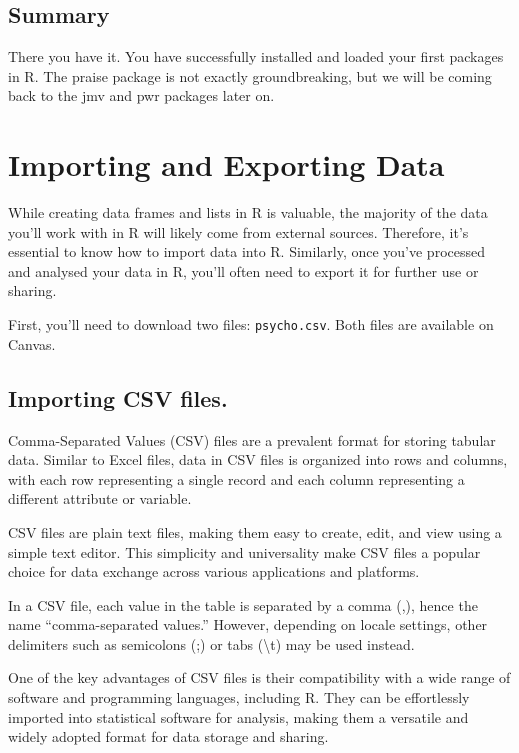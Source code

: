 \documentclass[
]{book}
\begin{document}
\subsection{Summary}\label{summary-2}

There you have it. You have successfully installed and loaded your first packages in R. The praise package is not exactly groundbreaking, but we will be coming back to the jmv and pwr packages later on.

\section{Importing and Exporting Data}\label{importing}

While creating data frames and lists in R is valuable, the majority of the data you'll work with in R will likely come from external sources. Therefore, it's essential to know how to import data into R. Similarly, once you've processed and analysed your data in R, you'll often need to export it for further use or sharing.

First, you'll need to download two files: \texttt{psycho.csv}. Both files are available on Canvas.

\subsection{Importing CSV files.}\label{importing-csv-files.}

Comma-Separated Values (CSV) files are a prevalent format for storing tabular data. Similar to Excel files, data in CSV files is organized into rows and columns, with each row representing a single record and each column representing a different attribute or variable.

CSV files are plain text files, making them easy to create, edit, and view using a simple text editor. This simplicity and universality make CSV files a popular choice for data exchange across various applications and platforms.

In a CSV file, each value in the table is separated by a comma (,), hence the name ``comma-separated values.'' However, depending on locale settings, other delimiters such as semicolons (;) or tabs (\textbackslash t) may be used instead.

One of the key advantages of CSV files is their compatibility with a wide range of software and programming languages, including R. They can be effortlessly imported into statistical software for analysis, making them a versatile and widely adopted format for data storage and sharing.
\end{document}
